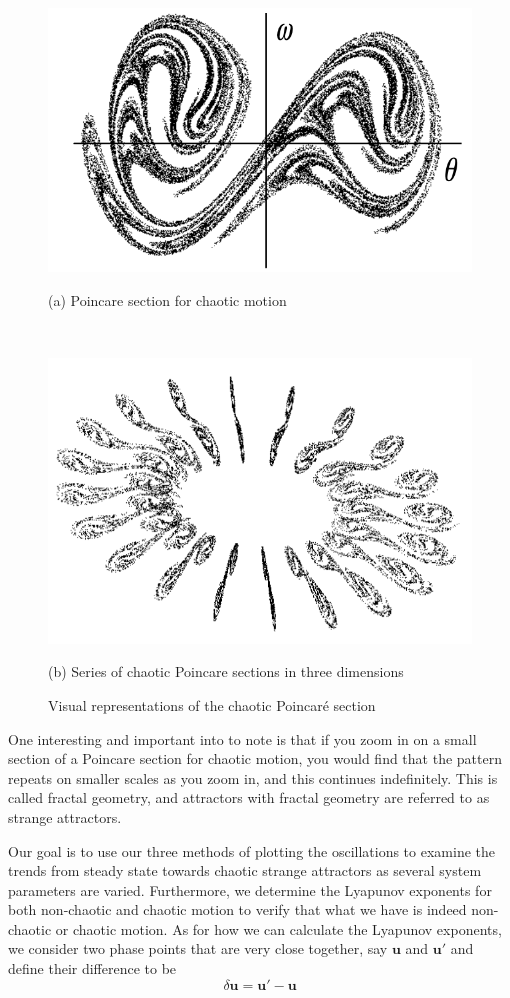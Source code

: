 \documentclass[twocolumn,amsmath,amssymb,pra, floatfix]{revtex4-2}
\begin{document}
\begin{figure}[H]
 \centering
 \begin{minipage}{0.7\linewidth}
    \centering 
    \includegraphics[width = 0.7\linewidth]{images/Poincare_section_chaos_.png}
    \caption*{(a) Poincare section for chaotic motion}
 \end{minipage}%
 \\[2mm]
  \begin{minipage}{0.7\linewidth}
    \centering 
    \includegraphics[width = 0.7\linewidth]{images/Poincare_section_chaos_3D.png}
    \caption*{(b) Series of chaotic Poincare sections in three dimensions}
 \end{minipage}%
 \caption{Visual representations of the chaotic Poincar\'{e} section}
 \label{fig: Chaotic Poincare section graphs}
\end{figure}

One interesting and important into to note is that if you zoom in on a small section of a Poincare section for chaotic motion, you would find that the pattern repeats on smaller scales as you zoom in, and this continues indefinitely. This is called fractal geometry, and attractors with fractal geometry are referred to as strange attractors. 

Our goal is to use our three methods of plotting the oscillations to examine the trends from steady state towards chaotic strange attractors as several system parameters are varied. Furthermore, we determine the Lyapunov exponents for both non-chaotic and chaotic motion to verify that what we have is indeed non-chaotic or chaotic motion. As for how we can calculate the Lyapunov exponents, we consider two phase points that are very close together, say $\mathbf{u}$ and $\mathbf{u}'$ and define their difference to be 
\begin{equation}
    \delta \mathbf{u} = \mathbf{u}' - \mathbf{u}
    \label{eq:10}
\end{equation}
\end{document}
